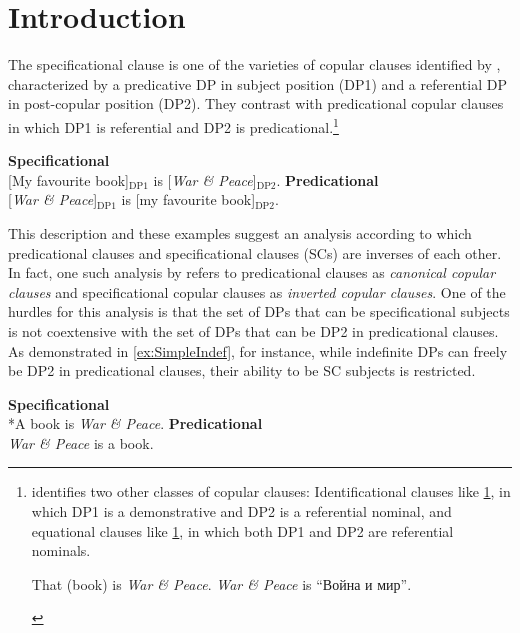 \documentclass[
	letterpaper,
]{article}
\begin{document}
\section{Introduction}
The specificational clause is one of the varieties of copular clauses identified by \textcite{higgins1973pseudo}, characterized by a predicative DP in subject position (DP1) and a referential DP in post-copular position (DP2).
They contrast with predicational copular clauses in which DP1 is referential and DP2 is predicational.\footnote{
	\textcite{higgins1973pseudo} identifies two other classes of copular clauses:
	Identificational clauses like \ref{ex:IDCl}, in which DP1 is a demonstrative and DP2 is a referential nominal, and equational clauses like \ref{ex:EqCl}, in which both DP1 and DP2 are referential nominals.
	\begin{xlisti}
		\ex\label{ex:IDCl} That (book) is \textit{War \& Peace}.
		\ex\label{ex:EqCl} \textit{War \& Peace} is \foreignlanguage{russian}{``Война и мир''}.	
	\end{xlisti}

}
\begin{exe}
	\ex
	\begin{xlist}	
		\ex \textbf{Specificational}\\
		{[My favourite book]$_{\text{DP1}}$} is {[\textit{War \& Peace}]$_{\text{DP2}}$}.
		\ex \textbf{Predicational}\\
		{[\textit{War \& Peace}]$_{\text{DP1}}$} is {[my favourite book]$_{\text{DP2}}$}.
	\end{xlist}
\end{exe}
This description and these examples suggest an analysis according to which predicational clauses and specificational clauses (SCs) are inverses of each other.
In fact, one such analysis by \textcite{moro1997raising} refers to predicational clauses as \textit{canonical copular clauses} and specificational copular clauses as \textit{inverted copular clauses}.
One of the hurdles for this analysis is that the set of DPs that can be specificational subjects is not coextensive with the set of DPs that can be DP2 in predicational clauses.
As demonstrated in \ref{ex:SimpleIndef}, for instance, while indefinite DPs can freely be DP2 in predicational clauses, their ability to be SC subjects is restricted. 
\begin{exe}
	\ex\label{ex:SimpleIndef}
	\begin{xlist}
		\ex  \textbf{Specificational}\\
		*A book is \textit{War \& Peace}.
		\ex \textbf{Predicational}\\
		\textit{War \& Peace} is a book.	
	\end{xlist}
\end{exe}
\end{document}
